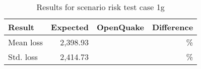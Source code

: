\begin{table}[htbp]

\centering
\begin{tabular}{ l r r r }

\hline
\rowcolor{anti-flashwhite}
\bf{Result} & \bf{Expected} & \bf{OpenQuake} & \bf{Difference}\\
\hline
Mean loss & 2,398.93 &  & \% \\
Std. loss & 2,414.73 &  & \% \\
\hline
\end{tabular}

\caption{Results for scenario risk test case 1g}
\label{tab:result-scenario-risk-1g}
\end{table}